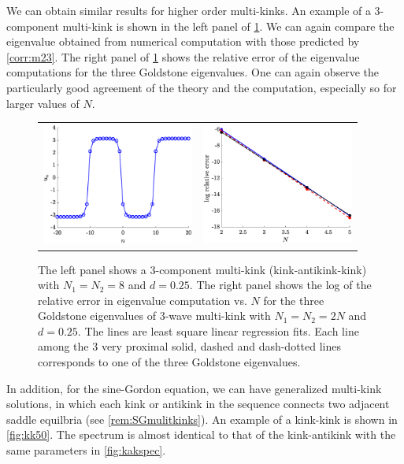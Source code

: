 \documentclass[12pt,reqno]{amsart}
\def\noi{\noindent}
\begin{document}
We can obtain similar results for higher order multi-kinks. An example of a 3-component multi-kink is shown in the left panel of \cref{fig:3p}. We can again compare the eigenvalue obtained from numerical computation with those predicted by \cref{corr:m23}. The right panel of \cref{fig:3p} shows the relative error of the eigenvalue computations for the three Goldstone eigenvalues.
One can again observe the particularly good agreement
of the theory and the computation, especially so for
larger values of $N$.

\begin{figure}
	\begin{center}
	\begin{tabular}{cc}
	\includegraphics[width=5cm]{3kink.eps} &
	\includegraphics[width=5cm]{goldstone3prelerror.eps}
	\end{tabular}
	\end{center}
	\caption{The left panel shows a 3-component multi-kink (kink-antikink-kink) with $N_1 = N_2 = 8$ and $d = 0.25$. 
	The right panel shows the log of the relative error in eigenvalue computation vs. $N$ for the three Goldstone eigenvalues of 3-wave multi-kink with $N_1 = N_2 = 2N$ and $d = 0.25$. The lines are least square linear regression fits. Each line among the 3 very proximal solid, dashed and dash-dotted
	lines corresponds to one of the three Goldstone eigenvalues.} 
	\label{fig:3p}
\end{figure}

\noi In addition, for the sine-Gordon equation, we can have generalized multi-kink solutions, in which each kink or antikink in the sequence connects two adjacent saddle equilbria (see \cref{rem:SGmulitkinks}). An example of a kink-kink is shown in \cref{fig:kk50}. The spectrum is almost identical to that of the kink-antikink with the same parameters in \cref{fig:kakspec}.
\end{document}
